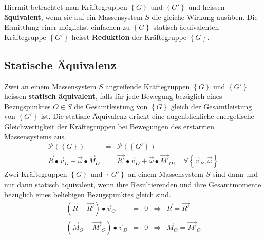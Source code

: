 Hiermit betrachtet man Kräftegruppen $\left\{G\right\}$ und $\left\{G'\right\}$ und heissen \textbf{äquivalent}, wenn sie auf ein Massensystem $S$ die gleiche Wirkung ausüben. Die Ermittlung einer möglichst einfachen zu $\left\{G\right\}$ statisch äquivalenten Kräftegruppe $\left\{G'\right\}$ heisst \textbf{Reduktion} der Kräftegruppe $\left\{G\right\}$.
\subsection{Statische Äquivalenz}
Zwei an einem Massensystem $S$ angreifende Kräftegruppen $\left\{G\right\}$ und $\left\{G'\right\}$ heissen \textbf{statisch äquivalent}, falls für jede Bewegung bezüglich eines Bezugspunktes $O\in S$ die Gesamtleistung von $\left\{G\right\}$ gleich der Gesamtleistung von $\left\{G'\right\}$ ist. Die statishe Äquivalenz drückt eine augenblickliche energetische Gleichwertigkeit der Kräftegruppen bei Bewegungen des erstarrten Massensystems aus.
\begin{equation}
\boxed{\begin{array}{lll}
\mathcal{P}\left(\left\{G\right\}\right)&=&\mathcal{P}\left(\left\{G'\right\}\right)\\
\overrightarrow{R}\bullet \overrightarrow{v}_O+\overrightarrow{\omega}\bullet \overrightarrow{M}_O&=&\overrightarrow{R'}\bullet \overrightarrow{v}_O+\overrightarrow{\omega}\bullet \overrightarrow{M'}_{O},\quad \forall\left\{\overrightarrow{v}_B,\overrightarrow{\omega}\right\}
\end{array}}
\end{equation}
Zwei Kräftegruppen $\left\{G\right\}$ und $\left\{G'\right\}$ an einem Massensystem $S$ sind dann und nur dann statisch äquivalent, wenn ihre Resultierenden und ihre Gesamtmomente bezüglich eines beliebigen Bezugspunktes gleich sind.
\begin{equation}
\boxed{\begin{array}{lllll}
\left(\overrightarrow{R}-\overrightarrow{R'}\right)\bullet \overrightarrow{v}_O&=&0&\Rightarrow& \overrightarrow{R}=\overrightarrow{R'}\\
\left(\overrightarrow{M}_O-\overrightarrow{M'}_{O}\right)\bullet \overrightarrow{v}_B&=&0&\Rightarrow &\overrightarrow{M}_O=\overrightarrow{M'}_O
\end{array}}
\end{equation}
\newline\newline
